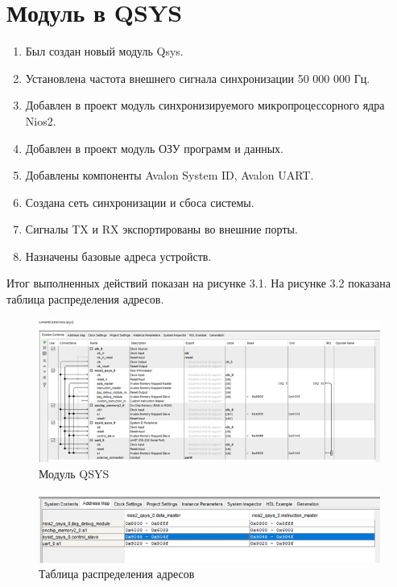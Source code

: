 \documentclass[12pt]{report}
\begin{document}
\section{Модуль в QSYS}
\begin{enumerate}
    \item Был создан новый модуль Qsys.
    \item Установлена частота внешнего сигнала синхронизации 50 000 000 Гц.
    \item Добавлен в проект модуль синхронизируемого микропроцессорного ядра Nios2.
    \item Добавлен в проект модуль ОЗУ программ и данных.
    \item Добавлены компоненты Avalon System ID, Avalon UART.
    \item Создана сеть синхронизации и сбоса системы.
    \item Сигналы TX и RX экспортированы во внешние порты.
    \item Назначены базовые адреса устройств.
\end{enumerate}
Итог выполненных действий показан на рисунке 3.1. На рисунке 3.2 показана таблица распределения адресов.
\begin{figure}
    \centering
    \includegraphics{report_files/Рисунок2.png}
    \caption{Модуль QSYS}
    \label{fig:my_label_2}
\end{figure}
\begin{figure}
    \centering
    \includegraphics{report_files/Рисунок3.png}
    \caption{Таблица распределения адресов}
    \label{fig:my_label_2}
\end{figure}
\newpage
\end{document}
